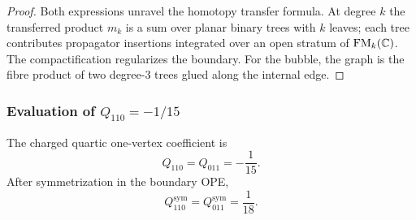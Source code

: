 \begin{proof}
Both expressions unravel the homotopy transfer formula. At degree
$k$ the transferred product $m_k$ is a sum over planar binary trees
with $k$ leaves; each tree contributes propagator insertions
integrated over an open stratum of $\mathrm{FM}_k(\mathbb C)$. The
compactification regularizes the boundary. For the bubble, the graph
is the fibre product of two degree-$3$ trees glued along the internal
edge.
\end{proof}

\subsubsection*{Evaluation of $Q_{110}=-1/15$}

\begin{theorem}
\label{thm:charged-quartic-coefficient}
The charged quartic one-vertex coefficient is
\begin{equation}
\label{eq:q110-value}
Q_{110}=Q_{011}=-\frac{1}{15}.
\end{equation}
After symmetrization in the boundary OPE,
\begin{equation}
\label{eq:q110-sym-value}
Q_{110}^{\mathrm{sym}}=Q_{011}^{\mathrm{sym}}=\frac{1}{18}.
\end{equation}
\end{theorem}

